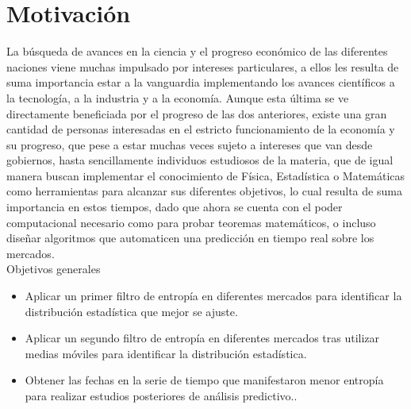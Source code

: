 %
\chapter*{Motivación}
\label{sec:acknowledgement}
\vspace*{-10mm}

 La búsqueda de avances en la ciencia y el progreso económico de las diferentes naciones viene muchas impulsado por intereses particulares, a ellos les resulta de suma importancia estar a la vanguardia implementando los avances científicos a la tecnología, a la industria y a la economía. Aunque esta última se ve directamente beneficiada por el progreso de las dos anteriores, existe una gran cantidad de personas interesadas en el estricto funcionamiento de la economía y su progreso, que pese a estar muchas veces sujeto a intereses que van desde gobiernos, hasta sencillamente individuos estudiosos de la materia, que de igual manera buscan implementar el conocimiento de Física, Estadística o Matemáticas como herramientas para alcanzar sus diferentes objetivos, lo cual resulta de suma importancia en estos tiempos, dado que ahora se cuenta con el poder computacional necesario como para probar teoremas matemáticos, o incluso diseñar algoritmos que automaticen una predicción en tiempo real sobre los mercados. \\[1cm]
 
{
\LARGE Objetivos generales
}
\begin{itemize}
	\item Aplicar un primer filtro de entropía en diferentes mercados para identificar la distribución estadística que mejor se ajuste.
	\item Aplicar un segundo filtro de entropía en diferentes mercados tras utilizar medias móviles para identificar la distribución estadística.
	\item Obtener las fechas en la serie de tiempo que manifestaron menor entropía para realizar estudios posteriores de análisis predictivo..
	
\end{itemize}